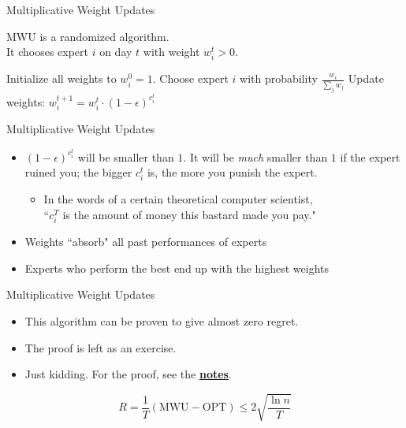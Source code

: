 \documentclass[10pt]{beamer}
\begin{document}
\begin{frame}[fragile]{Multiplicative Weight Updates}

MWU is a randomized algorithm. \\
It chooses expert $i$ on day $t$ with weight $w_i^t > 0$.
\begin{algorithm}[H]
\begin{algorithmic}[1]
\STATE Initialize all weights to $w_i^0 = 1$.
  \STATE Choose expert $i$ with probability $\frac{w_i}{\sum_jw_j}$
  \STATE Update weights: $w_i^{t + 1} = w_i^t \cdot (1 - \epsilon)^{c_i^t}$
\ENDFOR
\end{algorithmic}
\caption{Multiplicative Weight Updates}
\label{alg:mwu}
\end{algorithm}

\end{frame}

\begin{frame}[fragile]{Multiplicative Weight Updates}

\begin{itemize}
\item $(1 - \epsilon)^{c_i^t}$ will be smaller than $1$. It will be \textit{much} smaller than $1$ if the expert ruined you; the bigger $c_i^t$ is, the more you punish the expert.
  \begin{itemize}
  \item In the words of a certain theoretical computer scientist, \\
  ``$c_i^T$ is the amount of money this bastard made you pay."
  \end{itemize}
\item Weights ``absorb" all past performances of experts
\item Experts who perform the best end up with the highest weights
\end{itemize}

\end{frame}

\begin{frame}[fragile]{Multiplicative Weight Updates}

\begin{itemize}
\item This algorithm can be proven to give almost zero regret.
\item The proof is left as an exercise.
\item Just kidding. For the proof, see the \href{https://inst.eecs.berkeley.edu/~cs170/fa16/MWUCS170.pdf}{\textbf{notes}}.
\end{itemize}
$$R = \frac{1}{T}(\text{MWU} - \text{OPT}) \leq 2\sqrt{\frac{\ln{n}}{T}}$$

\end{frame}
\end{document}
